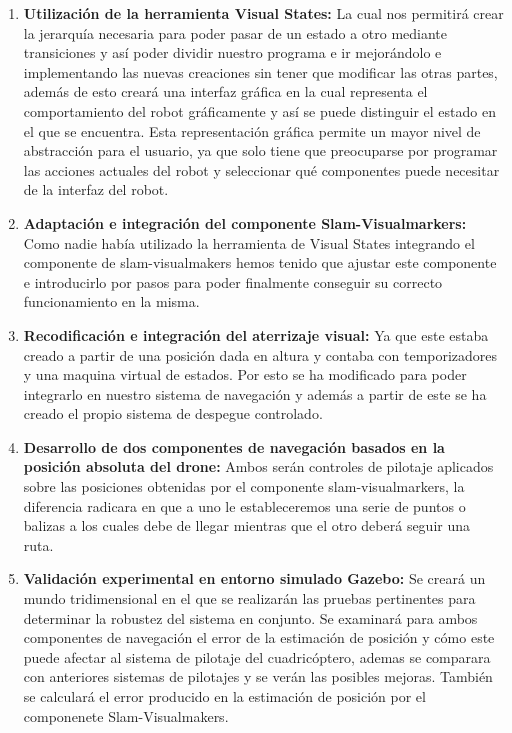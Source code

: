 \begin{enumerate}
	\item{\textbf{Utilización de la herramienta Visual States:} La cual nos permitirá crear la jerarquía necesaria para poder pasar de un estado a otro mediante transiciones y así poder dividir nuestro programa e ir mejorándolo e implementando las nuevas creaciones sin tener que modificar las otras partes, además de esto creará una interfaz gráfica en la cual representa el comportamiento del robot gráficamente y así se puede distinguir el estado en el que se encuentra. Esta representación gráfica permite un mayor nivel de abstracción para el usuario, ya que solo tiene que preocuparse por programar las acciones actuales del robot y seleccionar qué componentes puede necesitar de la interfaz del robot.}
	\item{\textbf{Adaptación e integración del componente Slam-Visualmarkers:} Como nadie había utilizado la herramienta de Visual States integrando el componente de slam-visualmakers hemos tenido que ajustar este componente e introducirlo por pasos para poder finalmente conseguir su correcto funcionamiento en la misma.}
	\item{\textbf{Recodificación e integración del aterrizaje visual:} Ya que este estaba creado a partir de una posición dada en altura y contaba con temporizadores y una maquina virtual de estados. Por esto se ha modificado para poder integrarlo en nuestro sistema de navegación y además a partir de este se ha creado el propio sistema de despegue controlado.}
	\item{\textbf{Desarrollo de dos componentes de navegación basados en la posición absoluta del drone:} Ambos serán controles de pilotaje aplicados sobre las posiciones obtenidas por el componente slam-visualmarkers, la diferencia radicara en que a uno le estableceremos una serie de puntos o balizas a los cuales debe de llegar mientras que el otro deberá seguir una ruta.}
	\item{\textbf{Validación experimental en entorno simulado Gazebo:} Se creará un mundo tridimensional en el que se realizarán las pruebas pertinentes para determinar la robustez
del sistema en conjunto. Se examinará para ambos componentes de navegación el error de la estimación de posición y cómo este puede afectar al sistema de pilotaje del cuadricóptero, ademas se comparara con anteriores sistemas de pilotajes y se verán las posibles mejoras. También se calculará el error producido en la estimación de posición por el componenete Slam-Visualmakers.}
\end{enumerate}



